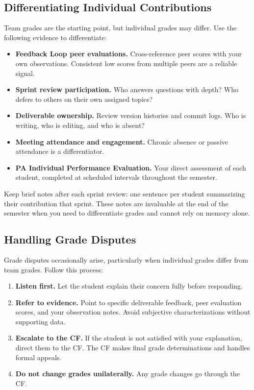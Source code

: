 \subsection{Differentiating Individual Contributions}

Team grades are the starting point, but individual grades may differ. Use the following evidence to differentiate:

\begin{itemize}[nosep,leftmargin=1.5em]
\item \textbf{Feedback Loop peer evaluations.} Cross-reference peer scores with your own observations. Consistent low scores from multiple peers are a reliable signal.
\item \textbf{Sprint review participation.} Who answers questions with depth? Who defers to others on their own assigned topics?
\item \textbf{Deliverable ownership.} Review version histories and commit logs. Who is writing, who is editing, and who is absent?
\item \textbf{Meeting attendance and engagement.} Chronic absence or passive attendance is a differentiator.
\item \textbf{PA Individual Performance Evaluation.} Your direct assessment of each student, completed at scheduled intervals throughout the semester.
\end{itemize}

\begin{tipbox}
Keep brief notes after each sprint review: one sentence per student summarizing their contribution that sprint. These notes are invaluable at the end of the semester when you need to differentiate grades and cannot rely on memory alone.
\end{tipbox}

\subsection{Handling Grade Disputes}

Grade disputes occasionally arise, particularly when individual grades differ from team grades. Follow this process:

\begin{enumerate}[nosep,leftmargin=1.5em]
\item \textbf{Listen first.} Let the student explain their concern fully before responding.
\item \textbf{Refer to evidence.} Point to specific deliverable feedback, peer evaluation scores, and your observation notes. Avoid subjective characterizations without supporting data.
\item \textbf{Escalate to the CF.} If the student is not satisfied with your explanation, direct them to the CF. The CF makes final grade determinations and handles formal appeals.
\item \textbf{Do not change grades unilaterally.} Any grade changes go through the CF.
\end{enumerate}

